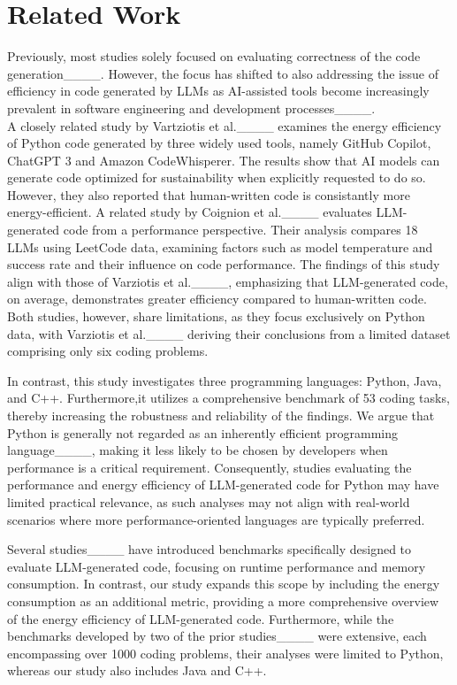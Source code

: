 \section{Related Work}
\label{sec:relatedWork}
Previously, most studies solely focused on evaluating correctness of the code generation____. However, the focus has shifted to also addressing the issue of efficiency in code generated by LLMs as AI-assisted tools become increasingly prevalent in software engineering and development processes____.
\\
A closely related study by Vartziotis et al.____ examines the energy efficiency of Python code generated by three widely used tools, namely GitHub Copilot, ChatGPT 3 and Amazon CodeWhisperer. The results show that AI models can generate code optimized for sustainability when explicitly requested to do so. However, they also reported that  human-written code is consistantly more energy-efficient.  A related study by Coignion et al.____ evaluates LLM-generated code from a performance perspective. Their analysis compares 18 LLMs using LeetCode data, examining factors such as model temperature and success rate and their influence on code performance. The findings of this study align with those of Varziotis et al.____, emphasizing that LLM-generated code, on average, demonstrates greater efficiency compared to human-written code. Both studies, however, share limitations, as they focus exclusively on Python data, with Varziotis et al.____ deriving their conclusions from a limited dataset comprising only six coding problems.
\par In contrast, this study investigates three programming languages: Python, Java, and C++. Furthermore,it utilizes a comprehensive benchmark of 53 coding tasks, thereby increasing the robustness and reliability of the findings. We argue that Python is generally not regarded as an inherently efficient programming language____, making it less likely to be chosen by developers when performance is a critical requirement. Consequently, studies evaluating the performance and energy efficiency of LLM-generated code for Python may have limited practical relevance, as such analyses may not align with real-world scenarios where more performance-oriented languages are typically preferred.
\par Several studies____ have introduced benchmarks specifically designed to evaluate LLM-generated code, focusing on runtime performance and memory consumption. In contrast, our study expands this scope by including the energy consumption as an additional metric, providing a more comprehensive overview of the energy efficiency of LLM-generated code. Furthermore, while the benchmarks developed by two of the prior studies____ were extensive, each encompassing over 1000 coding problems, their analyses were limited to Python, whereas our study also includes Java and C++. 
